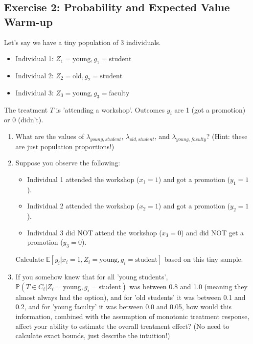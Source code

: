 \documentclass{article}
\newcommand{\E}{\mathbb{E}}
\renewcommand{\Pr}{\mathbb{P}}
\begin{document}
\subsection*{Exercise 2: Probability and Expected Value Warm-up}
Let's say we have a tiny population of 3 individuals.
\begin{itemize}
    \item Individual 1: $Z_1 = \text{young}, g_1 = \text{student}$
    \item Individual 2: $Z_2 = \text{old}, g_2 = \text{student}$
    \item Individual 3: $Z_3 = \text{young}, g_3 = \text{faculty}$
\end{itemize}
The treatment $T$ is 'attending a workshop'. Outcomes $y_i$ are 1 (got a promotion) or 0 (didn't).
\begin{enumerate}
    \item  What are the values of $\lambda_{young, student}$, $\lambda_{old, student}$, and $\lambda_{young, faculty}$? (Hint: these are just population proportions!)
    \item  Suppose you observe the following:
        \begin{itemize}
            \item Individual 1 attended the workshop ($x_1=1$) and got a promotion ($y_1=1$).
            \item Individual 2 attended the workshop ($x_2=1$) and got a promotion ($y_2=1$).
            \item Individual 3 did NOT attend the workshop ($x_3=0$) and did NOT get a promotion ($y_3=0$).
        \end{itemize}
        Calculate $\E[y_i | x_i = 1, Z_i = \text{young}, g_i = \text{student}]$ based on this tiny sample.
    \item  If you somehow knew that for all 'young students', $\Pr(T \in C_i | Z_i=\text{young}, g_i=\text{student})$ was between 0.8 and 1.0 (meaning they almost always had the option), and for 'old students' it was between 0.1 and 0.2, and for 'young faculty' it was between 0.0 and 0.05, how would this information, combined with the assumption of monotonic treatment response, affect your ability to estimate the overall treatment effect? (No need to calculate exact bounds, just describe the intuition!)
\end{enumerate}
\end{document}

